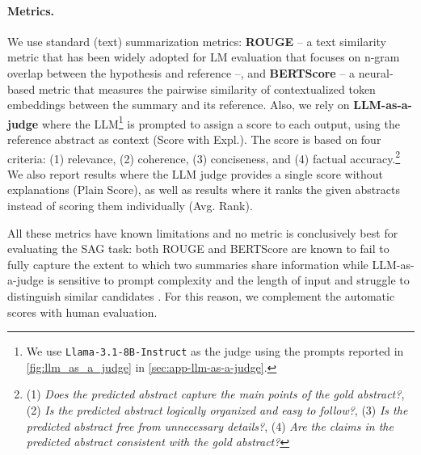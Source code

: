 \paragraph{Metrics.} 
We use standard
(text) summarization metrics: \textbf{ROUGE} \citep{lin-2004-rouge} -- a text similarity metric that has been widely adopted for LM evaluation \citep{grusky-2023-rogue} that focuses on n-gram overlap between the hypothesis and reference --, and \textbf{BERTScore} \citep{DBLP:conf/iclr/ZhangKWWA20} -- a neural-based metric that measures the pairwise similarity of contextualized token embeddings between the summary and its reference. 
Also, we rely on \textbf{LLM-as-a-judge} \citep{shen-etal-2023-large,zheng-llm-judge-2024} 
 where the LLM\footnote{We use \texttt{Llama-3.1-8B-Instruct} \citep{dubey2024llama3herdmodels} as the judge using the prompts reported in \cref{fig:llm_as_a_judge} in \cref{sec:app-llm-as-a-judge}.} is prompted to assign a score to each output, using the reference abstract as context (Score with Expl.). The score is
  based on four criteria: 
(1) relevance, (2) coherence, (3) conciseness, and (4) factual accuracy.\footnote{(1) \textit{Does the predicted abstract capture the main points of the gold abstract?}, (2) \textit{Is the predicted abstract logically organized and easy to follow?}, (3) \textit{Is the predicted abstract free from unnecessary details?}, (4) \textit{Are the claims in the predicted abstract consistent with the gold abstract?}}
 We also report results where the LLM judge provides a single score without explanations (Plain Score), as well as results where it ranks the given abstracts instead of scoring them individually (Avg. Rank).
 
 All these metrics have known limitations and no metric is conclusively best for evaluating the SAG task: both ROUGE and BERTScore are known to fail to fully capture the extent to which two summaries share information \citep{deutsch-roth-2021-understanding} while LLM-as-a-judge is sensitive to prompt complexity and the length of input \citep{thakur2024judgingjudgesevaluatingalignment} and struggle to distinguish similar candidates \citep{shen-etal-2023-large}. For this reason, we complement 
the automatic scores with
 human evaluation.


